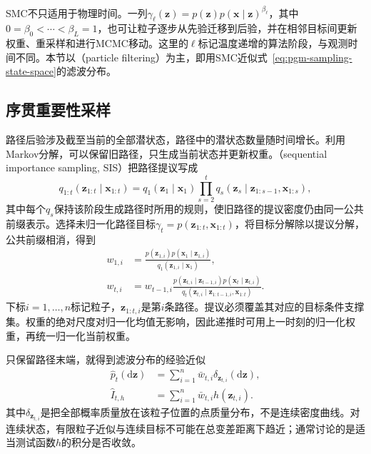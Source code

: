 SMC不只适用于物理时间。一列$\gamma_\ell(\bm{z})=p(\bm{z})p(\bm{x}\mid\bm{z})^{\beta_\ell}$，其中$0=\beta_0<\cdots<\beta_L=1$，也可让粒子逐步从先验迁移到后验，并在相邻目标间更新权重、重采样和进行MCMC移动。这里的$\ell$标记温度递增的算法阶段，与观测时间不同。本节以（particle filtering）为主，即用SMC近似式~\eqref{eq:pgm-sampling-state-space}的滤波分布。

\subsection{序贯重要性采样}
\label{sec:pgm-sampling-sis}

路径后验涉及截至当前的全部潜状态，路径中的潜状态数量随时间增长。利用Markov分解，可以保留旧路径，只生成当前状态并更新权重。（sequential importance sampling, SIS）把路径提议写成
\[
  q_{1:t}(\bm{z}_{1:t}\mid\bm{x}_{1:t})
    =q_1(\bm{z}_1\mid\bm{x}_1)
      \prod_{s=2}^{t}
        q_s(\bm{z}_s\mid\bm{z}_{1:s-1},\bm{x}_{1:s}),
\]
其中每个$q_s$保持该阶段生成路径时所用的规则，使旧路径的提议密度仍由同一公共前缀表示。选择未归一化路径目标$\gamma_t=p(\bm{z}_{1:t},\bm{x}_{1:t})$，将目标分解除以提议分解，公共前缀相消，得到
\begin{equation}
  \begin{aligned}
    w_{1,i}&=
      \frac{p(\bm{z}_{1,i})p(\bm{x}_1\mid\bm{z}_{1,i})}
           {q_1(\bm{z}_{1,i}\mid\bm{x}_1)},\\
    w_{t,i}&=w_{t-1,i}
      \frac{p(\bm{z}_{t,i}\mid\bm{z}_{t-1,i})
            p(\bm{x}_t\mid\bm{z}_{t,i})}
           {q_t(\bm{z}_{t,i}\mid\bm{z}_{1:t-1,i},\bm{x}_{1:t})}.
  \end{aligned}
  \label{eq:pgm-sampling-sis-weight}
\end{equation}
下标$i=1,\ldots,n$标记粒子，$\bm{z}_{1:t,i}$是第$i$条路径。提议必须覆盖其对应的目标条件支撑集。权重的绝对尺度对归一化均值无影响，因此递推时可用上一时刻的归一化权重，再统一归一化当前权重。

只保留路径末端，就得到滤波分布的经验近似
\begin{equation}
  \begin{aligned}
    \widehat p_t(\mathrm{d}\bm{z})
      &=\sum_{i=1}^{n}\bar w_{t,i}\delta_{\bm{z}_{t,i}}(\mathrm{d}\bm{z}),\\
    \widehat I_{t,h}&=\sum_{i=1}^{n}\bar w_{t,i}h(\bm{z}_{t,i}).
  \end{aligned}
  \label{eq:pgm-sampling-particle-measure}
\end{equation}
其中$\delta_{\bm{z}_{t,i}}$是把全部概率质量放在该粒子位置的点质量分布，不是连续密度曲线。对连续状态，有限粒子近似与连续目标不可能在总变差距离下趋近；通常讨论的是适当测试函数$h$的积分是否收敛。


